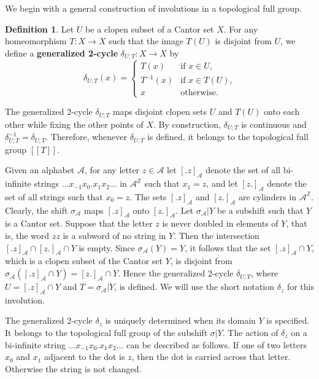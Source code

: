 \documentclass[12pt]{article}
\theoremstyle{definition}
\newtheorem{definition}[theorem]{Definition}
\def\bZ{\mathbb{Z}}
\def\cA{\mathcal{A}}
\def\de{\delta}
\def\si{\sigma}
\begin{document}
We begin with a general construction of involutions in a topological full 
group.

\begin{definition}\label{def-2-cycle}
Let $U$ be a clopen subset of a Cantor set $X$.  For any homeomorphism 
$T:X\to X$ such that the image $T(U)$ is disjoint from $U$, we define a 
\textbf{generalized 2-cycle} $\de_{U;T}:X\to X$ by
\[
\de_{U;T}(x)=
\begin{cases}
T(x) & \text{if $x\in U$,}\\
T^{-1}(x) & \text{if $x\in T(U)$,}\\
x & \text{otherwise.}
\end{cases}
\]
\end{definition}

The generalized $2$-cycle $\de_{U;T}$ maps disjoint clopen sets $U$ and 
$T(U)$ onto each other while fixing the other points of $X$.  By 
construction, $\de_{U;T}$ is continuous and $\de_{U;T}^{-1}=\de_{U;T}$.  
Therefore, whenever $\de_{U;T}$ is defined, it belongs to the topological 
full group $[[T]]$.

Given an alphabet $\cA$, for any letter $z\in\cA$ let $[.z]_{\cA}$ denote 
the set of all bi-infinite strings $\ldots x_{-1}x_0.x_1x_2\ldots$ in 
$\cA^{\bZ}$ such that $x_1=z$, and let $[z.]_{\cA}$ denote the set of all 
strings such that $x_0=z$.  The sets $[.z]_{\cA}$ and $[z.]_{\cA}$ are 
cylinders in $\cA^{\bZ}$.  Clearly, the shift $\si_{\cA}$ maps $[.z]_{\cA}$ 
onto $[z.]_{\cA}$.  Let $\si_{\cA}|Y$ be a subshift such that $Y$ is a 
Cantor set.  Suppose that the letter $z$ is never doubled in elements of 
$Y$, that is, the word $zz$ is a subword of no string in $Y$.  Then the 
intersection $[.z]_{\cA}\cap [z.]_{\cA}\cap Y$ is empty.  Since 
$\si_{\cA}(Y)=Y$, it follows that the set $[.z]_{\cA}\cap Y$, which is a 
clopen subset of the Cantor set $Y$, is disjoint from 
$\si_{\cA}([.z]_{\cA}\cap Y)=[z.]_{\cA}\cap Y$.  Hence the generalized 
$2$-cycle $\de_{U;T}$, where $U=[.z]_{\cA}\cap Y$ and $T=\si_{\cA}|Y$, is 
defined.  We will use the short notation $\de_z$ for this involution.  

The generalized $2$-cycle $\de_z$ is uniquely determined when its domain 
$Y$ is specified.  It belongs to the topological full group of the subshift 
$\si|Y$.  The action of $\de_z$ on a bi-infinite string $\ldots 
x_{-1}x_0.x_1x_2\ldots$ can be described as follows.  If one of two letters 
$x_0$ and $x_1$ adjacent to the dot is $z$, then the dot is carried across 
that letter.  Otherwise the string is not changed.
\end{document}
